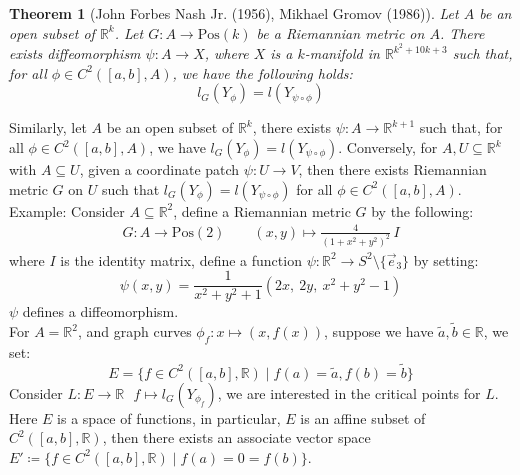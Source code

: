 \documentclass[15pt]{book}
\theoremstyle{break}
\theoremstyle{break}
\newtheorem{thm}{Theorem}[section]
\newcommand{\R}{\mathbb{R}}
\newcommand{\that}[1]{\widetilde{#1}}
\newcommand{\example}{\color{green}Example: \color{black}}
\begin{document}
\newpage
\begin{thm}[John Forbes Nash Jr. (1956), Mikhael Gromov (1986)]
Let $A$ be an open subset of $\R^k$. Let $G:A \to \text{Pos}(k)$ be a Riemannian metric on $A$. There exists diffeomorphism $\psi : A \to X$, where $X$ is a $k$-manifold in $\R^{k^2 + 10k +3}$ such that, for all $\phi\in C^2([a,b],A)$, we have the following holds:
$$ l_G(Y_\phi) = l(Y_{\psi \circ \phi})$$
\end{thm}
Similarly, let $A$ be an open subset of $\R^k$, there exists $\psi : A \to \R^{k+1}$ such that, for all $\phi\in C^2([a,b],A)$, we have $ l_G(Y_\phi) = l(Y_{\psi \circ \phi})$. Conversely, for $A,U \subseteq \R^k$ with $A \subseteq U$, given a coordinate patch $\psi: U \to V$, then there exists Riemannian metric $G$ on $U$ such that $ l_G(Y_\phi) = l(Y_{\psi \circ \phi})$ for all $\phi \in  C^2([a,b],A)$.\\

\example
Consider $A\subseteq \R^2$, define a Riemannian metric $G$ by the following:
\begin{align*}
G:A\to \text{Pos}(2) \qquad (x,y)\mapsto\frac{4}{(1+x^2 + y^2)^2}\, I
\end{align*} 
where $I$ is the identity matrix, define a function $\psi:\R^2 \to S^2\setminus \{\vec{e}_3\}$ by setting: 
$$\psi(x,y) = \frac{1}{x^2 + y^2 + 1}(2x,\ 2y,\ x^2 +y^2 -1)$$ 
$\psi$ defines a diffeomorphism. \\

\hfill\break
For $A = \R^2$, and graph curves $\phi_f : x \mapsto (x,f(x))$, suppose we have $\that{a},\that{b} \in \R$, we set: 
$$E = \{ f\in C^2([a,b], \R)\mid f(a) = \that{a}, f(b) = \that{b}\}$$ Consider $L:E \to \R \ \ \ f\mapsto l_G(Y_{\phi_f})$, we are interested in the critical points for $L$.\\

Here $E$ is a space of functions, in particular, $E$ is an affine subset of $C^2([a,b],\R)$, then there exists an associate vector space $E' \coloneqq \{f \in C^2([a,b], \R) \mid f(a) = 0 = f(b)\}$. \\
\end{document}
